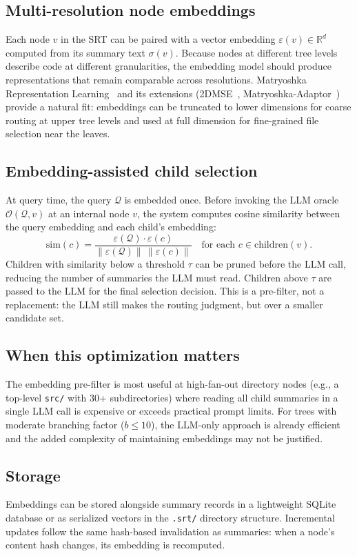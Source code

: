\documentclass[11pt,a4paper]{article}
\newcommand{\srt}{\textsc{SRT}}
\newcommand{\summ}{\sigma}
\newcommand{\embed}{\varepsilon}
\newcommand{\query}{\mathcal{Q}}
\begin{document}
\subsection{Multi-resolution node embeddings}

Each node $v$ in the \srt{} can be paired with a vector embedding $\embed(v) \in \mathbb{R}^d$ computed from its summary text $\summ(v)$.
Because nodes at different tree levels describe code at different granularities, the embedding model should produce representations that remain comparable across resolutions.
Matryoshka Representation Learning~\cite{kusupati2022matryoshka} and its extensions (2DMSE~\cite{2dmse2024}, Matryoshka-Adaptor~\cite{matadaptor2024}) provide a natural fit: embeddings can be truncated to lower dimensions for coarse routing at upper tree levels and used at full dimension for fine-grained file selection near the leaves.

\subsection{Embedding-assisted child selection}

At query time, the query $\query$ is embedded once.
Before invoking the LLM oracle $\mathcal{O}(\query, v)$ at an internal node $v$, the system computes cosine similarity between the query embedding and each child's embedding:
\[
\text{sim}(c) = \frac{\embed(\query) \cdot \embed(c)}{\|\embed(\query)\| \, \|\embed(c)\|}
\quad \text{for each } c \in \text{children}(v).
\]
Children with similarity below a threshold $\tau$ can be pruned before the LLM call, reducing the number of summaries the LLM must read.
Children above $\tau$ are passed to the LLM for the final selection decision.
This is a pre-filter, not a replacement: the LLM still makes the routing judgment, but over a smaller candidate set.

\subsection{When this optimization matters}

The embedding pre-filter is most useful at high-fan-out directory nodes (e.g., a top-level \texttt{src/} with 30+ subdirectories) where reading all child summaries in a single LLM call is expensive or exceeds practical prompt limits.
For trees with moderate branching factor ($b \leq 10$), the LLM-only approach is already efficient and the added complexity of maintaining embeddings may not be justified.

\subsection{Storage}

Embeddings can be stored alongside summary records in a lightweight SQLite database or as serialized vectors in the \texttt{.srt/} directory structure.
Incremental updates follow the same hash-based invalidation as summaries: when a node's content hash changes, its embedding is recomputed.
\end{document}
